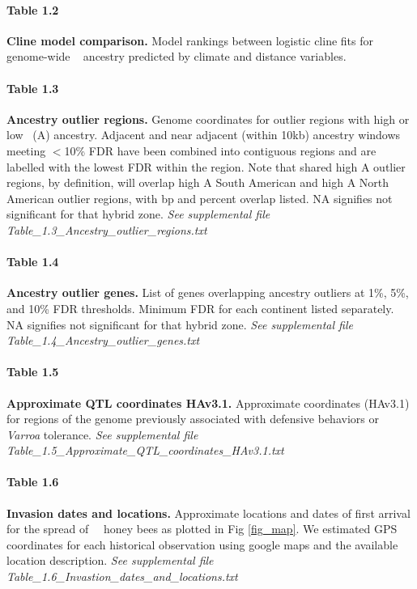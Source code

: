\paragraph*{Table 1.2}
\label{table_AIC_climate_clines}
{\bf Cline model comparison.} Model rankings between logistic cline fits for genome-wide \scutellata\  ancestry predicted by climate and distance variables.


\paragraph*{Table 1.3}
\label{table_outliers}
{\bf Ancestry outlier regions.} Genome coordinates for outlier regions with high or low \scutellata\ (A) ancestry. Adjacent and near adjacent (within 10kb) ancestry windows meeting $<$10\% FDR have been combined into contiguous regions and are labelled with the lowest FDR within the region. Note that shared high A outlier regions, by definition, will overlap high A South American and high A North American outlier regions, with bp and percent overlap listed. NA signifies not significant for that hybrid zone.
\textit{See supplemental file Table\_1.3\_Ancestry\_outlier\_regions.txt}

\paragraph*{Table 1.4}
\label{table_genes}
{\bf Ancestry outlier genes.} List of genes overlapping ancestry outliers at 1\%, 5\%, and 10\% FDR thresholds. Minimum FDR for each continent listed separately. NA signifies not significant for that hybrid zone.
\textit{See supplemental file Table\_1.4\_Ancestry\_outlier\_genes.txt}

\paragraph*{Table 1.5}
\label{table_qtl}
{\bf Approximate QTL coordinates HAv3.1.} Approximate coordinates (HAv3.1) for regions of the genome previously associated with defensive behaviors or \textit{Varroa} tolerance.
\textit{See supplemental file Table\_1.5\_Approximate\_QTL\_coordinates\_HAv3.1.txt}

\paragraph*{Table 1.6}
\label{table_hx_dates}
{\bf Invasion dates and locations.} Approximate locations and dates of first arrival for the spread of \africanized\ \hyb\ honey bees as plotted in Fig \ref{fig_map}. We estimated GPS coordinates for each historical observation using google maps and the available location description.
\textit{See supplemental file Table\_1.6\_Invastion\_dates\_and\_locations.txt}
\newline

